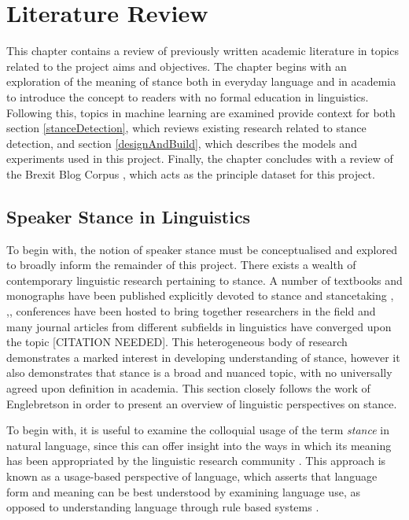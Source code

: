\documentclass[Dissertation.tex]{subfiles}
\begin{document}
\chapter{Literature Review}
This chapter contains a review of previously written academic literature in topics related to the project aims and objectives. The chapter begins with an exploration of the meaning of stance both in everyday language and in academia to introduce the concept to readers with no formal education in linguistics.  Following this, topics in machine learning are examined provide context for both section \ref{stanceDetection}, which reviews existing research related to stance detection, and section \ref{designAndBuild}, which describes the models and experiments used in this project. Finally, the chapter concludes with a review of the Brexit Blog Corpus \cite{simakiAnnotatingSpeakerStance2017}, which acts as the principle dataset for this project.
 
\section{Speaker Stance in Linguistics}
To begin with, the notion of speaker stance must be conceptualised and explored to broadly inform the remainder of this project. There exists a wealth of contemporary linguistic research pertaining to stance. A number of textbooks and monographs have been published explicitly devoted to stance and stancetaking
\cite{hunstonEvaluationTextAuthorial2000}, \cite{englebretsonStancetakingDiscourseSubjectivity2007},\cite{karkkainenEpistemicStanceEnglish2003}, 
%
conferences have been hosted to bring together researchers in the field
%
%
and  many journal articles from different subfields in linguistics have converged upon the topic [CITATION NEEDED]. This heterogeneous body of research demonstrates a marked interest in developing understanding of stance, however it also demonstrates that stance is a broad and nuanced topic, with no universally agreed upon definition in academia. This section closely follows the work of Englebretson \cite{englebretsonStancetakingDiscourseSubjectivity2007} in order to present an overview of linguistic perspectives on stance.

To begin with, it is useful to examine the colloquial usage of the term \textit{stance} in natural language, since this can offer insight into the ways in which its meaning has been appropriated by the linguistic research community \cite{englebretsonStancetakingDiscourseSubjectivity2007}. This approach is known as a usage-based perspective of language, which asserts that language form and meaning can be best understood by examining language use, as opposed to understanding language through rule based systems \cite{barlowUsagebasedModelsLanguage2000}. 
\end{document}
